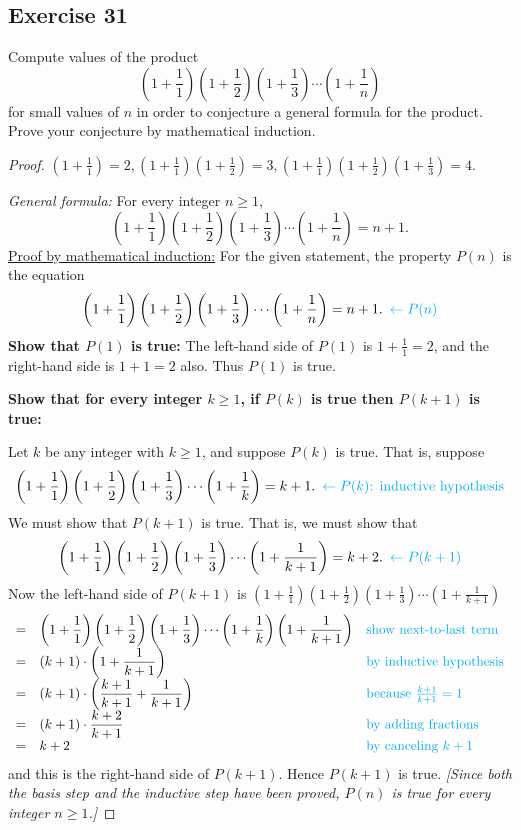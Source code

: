 \documentclass[14pt]{extarticle}
\newcommand{\dps}{\displaystyle}
\newcommand{\from}{\leftarrow}
\newcommand{\cy}{\color{cyan}}
\begin{document}
\subsection{Exercise 31}
Compute values of the product
\[
\left(1 + \frac{1}{1}\right)\left(1 + \frac{1}{2}\right)\left(1 + \frac{1}{3}\right) \cdots \left(1 + \frac{1}{n}\right)
\]
for small values of $n$ in order to conjecture a general formula for the product. Prove your conjecture by mathematical induction.

\begin{proof}
$\dps \left(1 + \frac{1}{1}\right) = 2, \left(1 + \frac{1}{1}\right)\left(1 + \frac{1}{2}\right) = \dps 3,
\left(1 + \frac{1}{1}\right)\left(1 + \frac{1}{2}\right)\left(1 + \frac{1}{3}\right) = \dps 4$.

{\it General formula:} For every integer $n \geq 1$,
\[
\dps \left(1 + \frac{1}{1}\right)\left(1 + \frac{1}{2}\right)\left(1 + \frac{1}{3}\right) \cdots \left(1 + \frac{1}{n}\right) = n+1.
\]
\underline{Proof by mathematical induction:}
For the given statement, the property $P(n)$ is the equation
\[
\dps \left(1 + \frac{1}{1}\right)\left(1 + \frac{1}{2}\right)\left(1 + \frac{1}{3}\right) \cdots \left(1 + \frac{1}{n}\right) = n+1. \,\,\, {\cy \from P(n)}
\]
{\bf Show that $P(1)$ is true:} The left-hand side of $P(1)$ is $1 + \frac{1}{1} = 2$, and the right-hand side is $1 + 1 = 2$ also. Thus $P(1)$ is true.

{\bf Show that for every integer $k \geq 1$, if $P(k)$ is true then $P(k + 1)$ is true:}

Let $k$ be any integer with $k \geq 1$, and suppose $P(k)$ is true. That is, suppose
\[
\dps \left(1 + \frac{1}{1}\right)\left(1 + \frac{1}{2}\right)\left(1 + \frac{1}{3}\right) \cdots \left(1 + \frac{1}{k}\right) = k+1. \,\,\, {\cy \from P(k) \text{: inductive hypothesis}}
\]
We must show that $P(k + 1)$ is true. That is, we must show that
\[
\dps \left(1 + \frac{1}{1}\right)\left(1 + \frac{1}{2}\right)\left(1 + \frac{1}{3}\right) \cdots \left(1 + \frac{1}{k+1}\right) = k+2. \,\,\,{\cy \from P(k+1)}
\]
Now the left-hand side of $P(k + 1)$ is $\left(1 + \frac{1}{1}\right)\left(1 + \frac{1}{2}\right)\left(1 + \frac{1}{3}\right) \cdots \left(1 + \frac{1}{k+1}\right)$
\[
\begin{array}{lll}
= & \dps \left(1 + \frac{1}{1}\right)\left(1 + \frac{1}{2}\right)\left(1 + \frac{1}{3}\right) \cdots \left(1 + \frac{1}{k}\right) \left(1 + \frac{1}{k+1}\right) & \text{\cy show next-to-last term} \\
= & \dps (k+1) \cdot \left(1 + \frac{1}{k+1}\right) & \text{\cy by inductive hypothesis} \\
= & \dps (k+1) \cdot \left(\frac{k+1}{k+1} + \frac{1}{k+1}\right) & \text{\cy because $\frac{k+1}{k+1} = 1$} \\
= & \dps (k+1) \cdot \frac{k+2}{k+1} & \text{\cy by adding fractions} \\
= & k+2 & \text{\cy by canceling $k+1$}
\end{array}
\]
and this is the right-hand side of $P(k + 1)$. Hence $P(k + 1)$ is true. {\it [Since both the basis step and the inductive step have been proved, $P(n)$ is true for every integer $n \geq 1$.]}
\end{proof}
\end{document}

